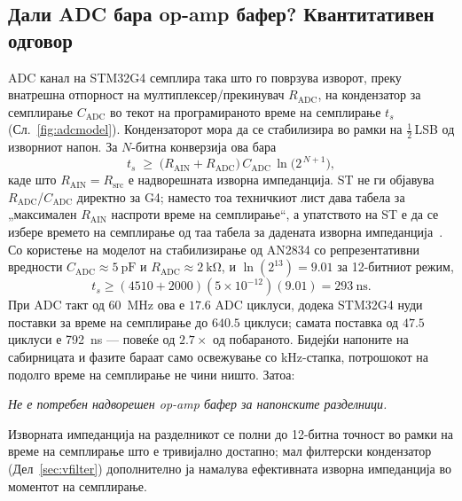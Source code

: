 \documentclass[journal,onecolumn,11pt]{IEEEtran}
\begin{document}
\subsection{Дали ADC бара op-amp бафер? Квантитативен одговор}\label{sec:buffer}
ADC канал на STM32G4 семплира така што го поврзува изворот, преку внатрешна отпорност
на мултиплексер/прекинувач $R_{\mathrm{ADC}}$, на кондензатор за семплирање
$C_{\mathrm{ADC}}$ во текот на програмираното време на семплирање $t_s$
(Сл.~\ref{fig:adcmodel}). Кондензаторот мора да се стабилизира во рамки на
$\tfrac12\,$LSB од изворниот напон. За $N$-битна конверзија ова бара~\cite{an2834,an5346}
\begin{equation}
t_s\;\ge\;\bigl(R_{\mathrm{AIN}}+R_{\mathrm{ADC}}\bigr)\,C_{\mathrm{ADC}}\,\ln\!\bigl(2^{\,N+1}\bigr),
\label{eq:settle}
\end{equation}
каде што $R_{\mathrm{AIN}}=R_{\mathrm{src}}$ е надворешната изворна импеданција. ST не
ги објавува $R_{\mathrm{ADC}}$/$C_{\mathrm{ADC}}$ директно за G4; наместо тоа
техничкиот лист дава табела за „максимален $R_{\mathrm{AIN}}$ наспроти време на
семплирање“, а упатството на ST е да се избере времето на семплирање од таа табела за
дадената изворна импеданција~\cite{an5346}. Со користење на моделот на стабилизирање
од AN2834 со репрезентативни вредности $C_{\mathrm{ADC}}\approx\SI{5}{\pico\farad}$ и
$R_{\mathrm{ADC}}\approx\SI{2}{\kilo\ohm}$, и $\ln(2^{13})=9.01$ за 12-битниот режим,
\begin{equation}
t_s\ge(4510+2000)(5\times10^{-12})(9.01)=\SI{293}{\nano\second}.
\end{equation}
При ADC такт од \SI{60}{\mega\hertz} ова е $17.6$ ADC циклуси, додека STM32G4 нуди
поставки за време на семплирање до $640.5$ циклуси; самата поставка од $47.5$ циклуси
е \SI{792}{\nano\second} --- повеќе од $2.7\times$ од побараното. Бидејќи напоните на
сабирницата и фазите бараат само освежување со kHz-стапка, потрошокот на подолго време
на семплирање не чини ништо. Затоа:
\begin{center}
\emph{Не е потребен надворешен op-amp бафер за напонските разделници.}
\end{center}
Изворната импеданција на разделникот се полни до 12-битна точност во рамки на време на
семплирање што е тривијално достапно; мал филтерски кондензатор (Дел~\ref{sec:vfilter})
дополнително ја намалува ефективната изворна импеданција во моментот на семплирање.
\end{document}
